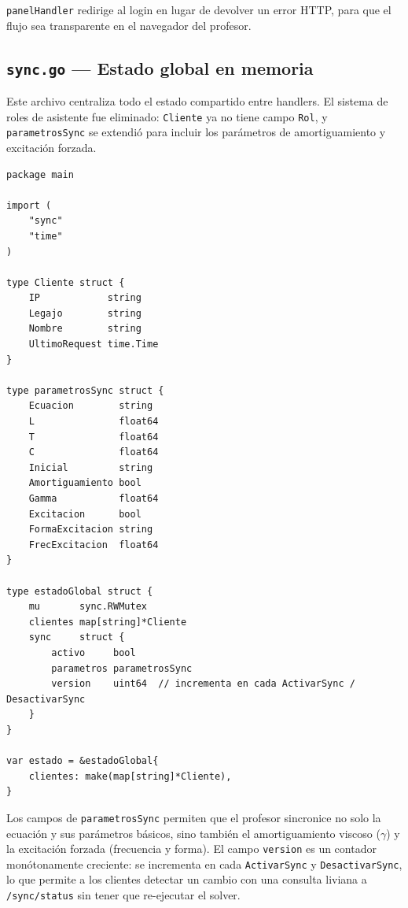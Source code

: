\documentclass[12pt, a4paper]{article}
\begin{document}
\texttt{panelHandler} redirige al login en lugar de devolver un error HTTP, para que
el flujo sea transparente en el navegador del profesor.

\subsection{\texttt{sync.go} — Estado global en memoria}

Este archivo centraliza todo el estado compartido entre handlers. El sistema de roles
de asistente fue eliminado: \texttt{Cliente} ya no tiene campo \texttt{Rol}, y
\texttt{parametrosSync} se extendió para incluir los parámetros de amortiguamiento
y excitación forzada.

\begin{lstlisting}[style=golang, caption={\texttt{sync.go} — tipos y estado global}]
package main

import (
    "sync"
    "time"
)

type Cliente struct {
    IP            string
    Legajo        string
    Nombre        string
    UltimoRequest time.Time
}

type parametrosSync struct {
    Ecuacion        string
    L               float64
    T               float64
    C               float64
    Inicial         string
    Amortiguamiento bool
    Gamma           float64
    Excitacion      bool
    FormaExcitacion string
    FrecExcitacion  float64
}

type estadoGlobal struct {
    mu       sync.RWMutex
    clientes map[string]*Cliente
    sync     struct {
        activo     bool
        parametros parametrosSync
        version    uint64  // incrementa en cada ActivarSync / DesactivarSync
    }
}

var estado = &estadoGlobal{
    clientes: make(map[string]*Cliente),
}
\end{lstlisting}

Los campos de \texttt{parametrosSync} permiten que el profesor sincronice no solo la
ecuación y sus parámetros básicos, sino también el amortiguamiento viscoso ($\gamma$) y
la excitación forzada (frecuencia y forma). El campo \texttt{version} es un contador
monótonamente creciente: se incrementa en cada \texttt{ActivarSync} y
\texttt{DesactivarSync}, lo que permite a los clientes detectar un cambio con una
consulta liviana a \texttt{/sync/status} sin tener que re-ejecutar el solver.
\end{document}
